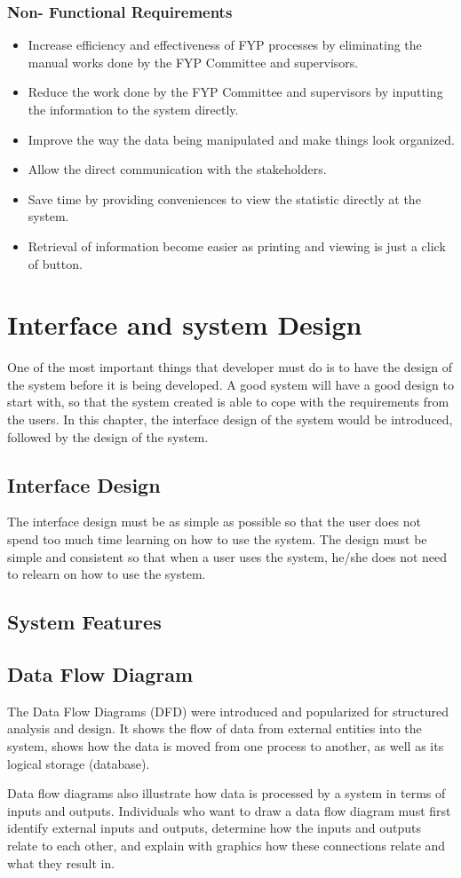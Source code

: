 \documentclass{article}
\begin{document}
\subsubsection{Non- Functional Requirements}
\begin{itemize}
\item Increase efficiency and effectiveness of FYP processes by eliminating the manual works done by the FYP Committee and supervisors.
\item Reduce the work done by the FYP Committee and supervisors by inputting the information to the system directly.
\item Improve the way the data being manipulated and make things look organized.
\item Allow the direct communication with the stakeholders.
\item Save time by providing conveniences to view the statistic directly at the system.
\item Retrieval of information become easier as printing and viewing is just a click of button.
\end{itemize}
\section{Interface and system Design}
\par One of the most important things that developer must do is to have the design of the system before it is
being developed. A good system will have a good design to start with, so that the system created is able to cope with the requirements from the users. In this chapter, the interface design of the system would be introduced, followed by the design of the system.
\subsection{Interface Design}
\par The interface design must be as simple as possible so that the user does not spend too much time  learning on how to use the system. The design must be simple and consistent so that when a user uses the system, he/she does not need to relearn on how to use the system.
\subsection{System Features}
\subsection{Data Flow Diagram}
\par The Data Flow Diagrams (DFD) were introduced and popularized for structured analysis and design.\cite{scort} It shows the flow of data from external entities into the system, shows how the data is  moved from one process to another, as well as its logical storage (database).
\par Data flow diagrams also illustrate how data is processed by a system in terms of inputs and outputs. Individuals who want to draw a data flow diagram must first identify external inputs and outputs, determine how the inputs and outputs relate to each other, and explain with graphics how these connections relate and what they result in.
\newpage
\end{document}
